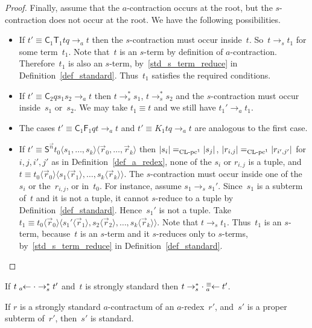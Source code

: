 \documentclass[a4paper,UKenglish]{lipics-v2016}
\newcommand{\Cs}{\mathsf{C}}
\newcommand{\Fs}{\mathsf{F}}
\newcommand{\Ts}{\mathsf{T}}
\newcommand{\Ss}{\mathsf{S}}
\newcommand{\from}{\ensuremath{\leftarrow}}
\newcommand{\reduces}{\ensuremath{\to^*}}
\newcommand{\erase}[1]{\ensuremath{|#1|}}
\newcommand{\la}{\ensuremath{\langle}}
\newcommand{\ra}{\ensuremath{\rangle}}
\newcommand{\leftidx}[3]{{\;\vphantom{#2}}#1\!\!#2#3}
\newcommand{\sCLC}{{\ensuremath{\text{\rm CL-pc}^1}}}
\begin{document}
\begin{proof}
  Finally, assume that the $a$-contraction occurs at the root, but the
  $s$-contraction does not occur at the root. We have the following
  possibilities.
  \begin{itemize}
  \item If $t' \equiv \Cs_1 \Ts_1 t q \to_a t$ then the
    $s$-contraction must occur inside~$t$. So~$t \to_s t_1$ for
    some term~$t_1$. Note that~$t$ is an $s$-term by definition of
    $a$-contraction. Therefore~$t_1$ is also an $s$-term,
    by~\ref{std_s_term_reduce} in
    Definition~\ref{def_standard}. Thus~$t_1$ satisfies the required
    conditions.
  \item If $t' \equiv \Cs_2 q s_1 s_2 \to_a t$ then $t \to_s^{*} s_1$,
    $t \to_s^{*} s_2$ and the $s$-contraction must occur inside~$s_1$
    or~$s_2$. We may take $t_1 \equiv t$ and we still have
    $t_1' \to_a t_1$.
  \item The cases $t' \equiv \Cs_1 \Fs_1 q t \to_a t$ and
    $t' \equiv K_1 t q \to_a t$ are analogous to the first case.
  \item If
    $t' \equiv \Ss^{\vec{n}} t_0 \la s_1,\ldots,s_{k} \ra \la
    \vec{r}_0,\ldots,\vec{r}_k \ra$ then
    $\erase{s_i} =_\sCLC \erase{s_j}$,
    $\erase{r_{i,j}} =_\sCLC \erase{r_{i',j'}}$ for $i,j,i',j'$ as in
    Definition~\ref{def_a_redex}, none of the $s_i$ or $r_{i,j}$ is a
    tuple, and
    $t \equiv t_0 \la \vec{r}_0 \ra \la s_1 \la \vec{r}_1 \ra, \ldots,
    s_{k} \la \vec{r}_k \ra \ra$. The $s$-contraction must occur
    inside one of the~$s_i$ or the~$r_{i,j}$, or in~$t_0$. For
    instance, assume $s_1 \to_s s_1'$. Since~$s_1$ is a subterm
    of~$t$ and it is not a tuple, it cannot $s$-reduce to a tuple by
    Definition~\ref{def_standard}. Hence~$s_1'$ is not a tuple. Take
    $t_1 \equiv t_0 \la \vec{r}_0 \ra \la s_1' \la \vec{r}_1 \ra, s_2
    \la \vec{r}_2 \ra, \ldots, s_{k} \la \vec{r}_k \ra \ra$. Note that
    $t \to_s t_1$. Thus~$t_1$ is an $s$-term, because~$t$ is an
    $s$-term and it $s$-reduces only to $s$-terms,
    by~\ref{std_s_term_reduce} in Definition~\ref{def_standard}.
  \end{itemize}
\end{proof}

\begin{corollary}\label{cor_s_a_commute}
  If $t \leftidx{{}_a}{\from} \cdot \reduces_s t'$ and~$t$ is strongly
  standard then $t \reduces_s \cdot \leftidx{{}_a^\equiv}{\from} t'$.
\end{corollary}

\begin{lemma}\label{lem_properly_in_a_redex}
  If $r$ is a strongly standard $a$-contractum of an $a$-redex~$r'$,
  and~$s'$ is a proper subterm of~$r'$, then~$s'$ is standard.
\end{lemma}
\end{document}
